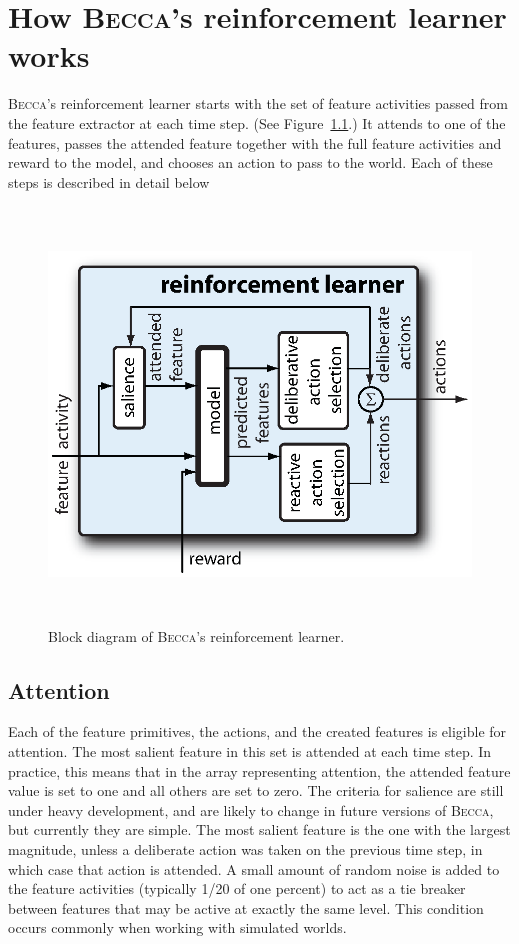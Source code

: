 \chapter{How \textsc{Becca}'s reinforcement learner works}
\label{actor_chapter}


\textsc{Becca}'s reinforcement learner starts with the set of feature activities passed from the feature extractor at each time step. (See Figure~\ref{becca_reinforcement_learner}.) It attends to one of the features, passes the attended feature together with the full feature activities and reward to the model, and chooses an action to pass to the world. Each of these steps is described in detail below  

\begin{figure}
\centering
\includegraphics[height=11cm]{figs/becca_reinforcement_learner.eps}
\caption{Block diagram of \textsc{Becca}'s reinforcement learner.}
\label{becca_reinforcement_learner}
\end{figure}

\section{Attention}
Each of the feature primitives, the actions, and the created features is eligible for attention. The most salient feature in this set is attended at each time step. In practice, this means that in the array representing attention, the attended feature value is set to one and all others are set to zero. The criteria for salience are still under heavy development, and are likely to change in future versions of \textsc{Becca}, but currently they are simple. The most salient feature is the one with the largest magnitude, unless a deliberate action was taken on the previous time step, in which case that action is attended. A small amount of random noise is added to the feature activities (typically 1/20 of one percent) to act as a tie breaker between features that may be active at exactly the same level. This condition occurs commonly when working with simulated worlds.

